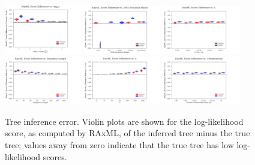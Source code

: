 \begin{figure} %
\centering
\includegraphics[width=0.3\textwidth]{figs/dualbirth-tree-score-diff-a}
\includegraphics[width=0.3\textwidth]{figs/dualbirth-tree-score-diff-b}
\includegraphics[width=0.3\textwidth]{figs/dualbirth-tree-score-diff-c}\\
\includegraphics[width=0.3\textwidth]{figs/dualbirth-tree-score-diff-d}
\includegraphics[width=0.3\textwidth]{figs/dualbirth-tree-score-diff-e}
\includegraphics[width=0.3\textwidth]{figs/dualbirth-tree-score-diff-f}
\caption[Tree inference error]
{Tree inference error. Violin plots are shown for the log-likelihood score, as computed by RAxML, of the inferred tree minus the true tree; values away from zero indicate that the true tree has low log-likelihood scores.}
\label{fig:dualbirth-tree-score-diff}
\end{figure}

